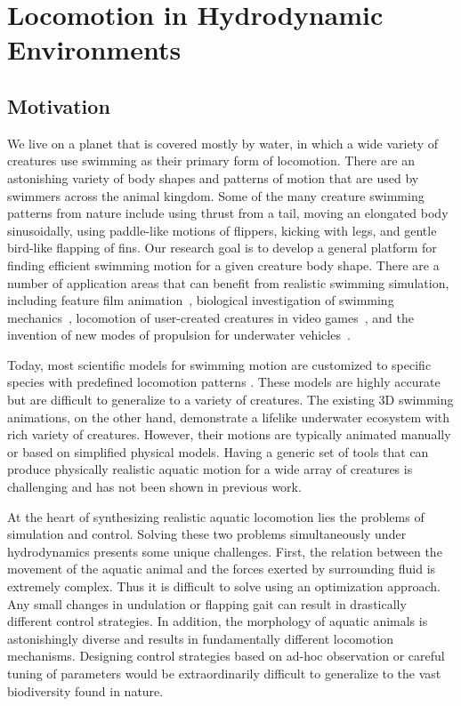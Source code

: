 \chapter{Locomotion in Hydrodynamic Environments}

\section{Motivation}

We live on a planet that is covered mostly by water, in which a wide variety of
creatures use swimming as their primary form of locomotion.  There are
an astonishing variety of body shapes and patterns of motion that are used
by swimmers across the animal kingdom.  Some of the many creature swimming
patterns from nature include using thrust from a tail, moving an elongated
body sinusoidally, using paddle-like motions of flippers, kicking with legs,
and gentle bird-like flapping of fins.  Our research goal is to develop a
general platform for finding efficient swimming motion for a given creature
body shape.  There are a number of application areas that can benefit from
realistic swimming simulation, including feature film
animation~\cite{stanton2003finding}, biological investigation of swimming
mechanics~\cite{kern2006simulations,shirgaonkar2008hydrodynamics},
locomotion of user-created creatures in video games~\cite{hecker2008real},
and the invention of new modes of propulsion for underwater
vehicles~\cite{barrett2002optimal}.

Today, most scientific models for swimming motion are customized to specific
species with predefined locomotion patterns
\cite{shirgaonkar2008hydrodynamics}. These models are
highly accurate but are difficult to generalize to a variety of creatures.
The existing 3D swimming animations, on the other hand, demonstrate a
lifelike underwater ecosystem with rich variety of creatures. However, their motions are typically animated
manually or based on simplified physical models. Having a generic set of
tools that can produce physically realistic aquatic motion for a wide array
of creatures is challenging and has not been shown in previous work.

At the heart of synthesizing realistic aquatic locomotion lies the
problems of simulation and control. Solving these two problems
simultaneously under hydrodynamics presents some unique
challenges. First, the relation between the movement of the aquatic
animal and the forces exerted by surrounding fluid is extremely
complex. Thus it is difficult to solve using an optimization approach. Any small
changes in undulation or flapping gait can result in drastically
different control strategies. In addition, the morphology of aquatic
animals is astonishingly diverse and results in fundamentally
different locomotion mechanisms. Designing control strategies based on
ad-hoc observation or careful tuning of parameters would be extraordinarily difficult to generalize to the vast biodiversity found in nature.


